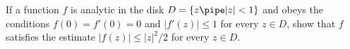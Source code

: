 If a function $f$ is analytic in the disk $D=\{z\pipe|z|<1\}$ and
obeys the conditions $f(0)=f'(0)=0$ and $|f'(z)|\leq 1$ for every
$z\in D$, show that $f$ satisfies the estimate $|f(z)|\leq |z|^2/2$
for every $z\in D$.
